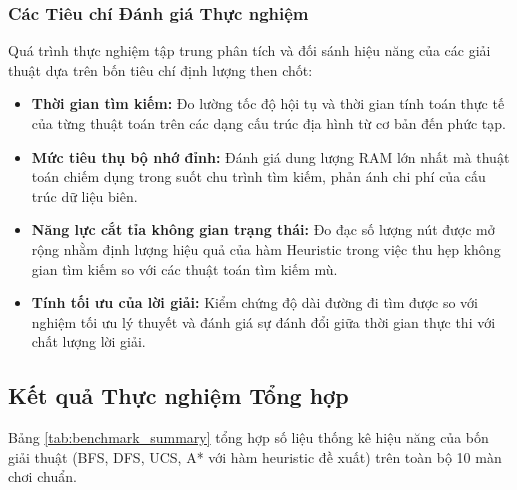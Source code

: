 \subsubsection{Các Tiêu chí Đánh giá Thực nghiệm}
Quá trình thực nghiệm tập trung phân tích và đối sánh hiệu năng của các giải thuật dựa trên bốn tiêu chí định lượng then chốt:
\begin{itemize}[--]
    \item \textbf{Thời gian tìm kiếm:} Đo lường tốc độ hội tụ và thời gian tính toán thực tế của từng thuật toán trên các dạng cấu trúc địa hình từ cơ bản đến phức tạp.
    \item \textbf{Mức tiêu thụ bộ nhớ đỉnh:} Đánh giá dung lượng RAM lớn nhất mà thuật toán chiếm dụng trong suốt chu trình tìm kiếm, phản ánh chi phí của cấu trúc dữ liệu biên.
    \item \textbf{Năng lực cắt tỉa không gian trạng thái:} Đo đạc số lượng nút được mở rộng nhằm định lượng hiệu quả của hàm Heuristic trong việc thu hẹp không gian tìm kiếm so với các thuật toán tìm kiếm mù.
    \item \textbf{Tính tối ưu của lời giải:} Kiểm chứng độ dài đường đi tìm được so với nghiệm tối ưu lý thuyết và đánh giá sự đánh đổi giữa thời gian thực thi với chất lượng lời giải.
\end{itemize}

\subsection{Kết quả Thực nghiệm Tổng hợp}
\label{subsec:exp_results}

Bảng \ref{tab:benchmark_summary} tổng hợp số liệu thống kê hiệu năng của
bốn giải thuật (BFS, DFS, UCS, A* với hàm heuristic đề xuất) trên toàn
bộ 10 màn chơi chuẩn.

